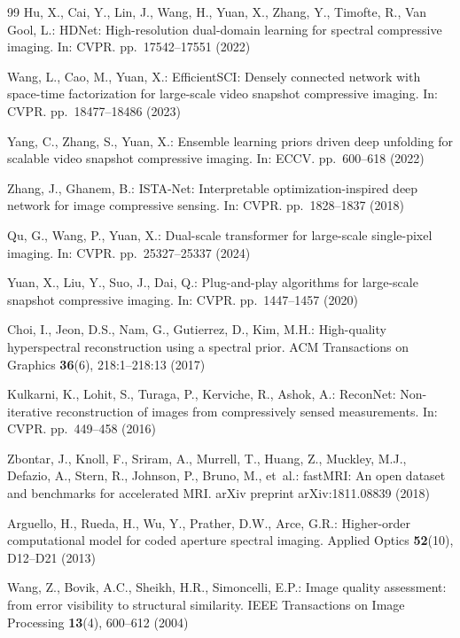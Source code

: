 \documentclass[runningheads]{llncs}
\begin{document}
\begin{thebibliography}{99}
Hu, X., Cai, Y., Lin, J., Wang, H., Yuan, X., Zhang, Y., Timofte, R., Van Gool, L.:
HDNet: High-resolution dual-domain learning for spectral compressive imaging.
In: CVPR. pp.~17542--17551 (2022)

Wang, L., Cao, M., Yuan, X.:
EfficientSCI: Densely connected network with space-time factorization for large-scale video snapshot compressive imaging.
In: CVPR. pp.~18477--18486 (2023)

Yang, C., Zhang, S., Yuan, X.:
Ensemble learning priors driven deep unfolding for scalable video snapshot compressive imaging.
In: ECCV. pp.~600--618 (2022)

Zhang, J., Ghanem, B.:
ISTA-Net: Interpretable optimization-inspired deep network for image compressive sensing.
In: CVPR. pp.~1828--1837 (2018)

Qu, G., Wang, P., Yuan, X.:
Dual-scale transformer for large-scale single-pixel imaging.
In: CVPR. pp.~25327--25337 (2024)

Yuan, X., Liu, Y., Suo, J., Dai, Q.:
Plug-and-play algorithms for large-scale snapshot compressive imaging.
In: CVPR. pp.~1447--1457 (2020)

Choi, I., Jeon, D.S., Nam, G., Gutierrez, D., Kim, M.H.:
High-quality hyperspectral reconstruction using a spectral prior.
ACM Transactions on Graphics \textbf{36}(6), 218:1--218:13 (2017)

Kulkarni, K., Lohit, S., Turaga, P., Kerviche, R., Ashok, A.:
ReconNet: Non-iterative reconstruction of images from compressively sensed measurements.
In: CVPR. pp.~449--458 (2016)

Zbontar, J., Knoll, F., Sriram, A., Murrell, T., Huang, Z., Muckley, M.J., Defazio, A., Stern, R., Johnson, P., Bruno, M., et~al.:
fastMRI: An open dataset and benchmarks for accelerated MRI.
arXiv preprint arXiv:1811.08839 (2018)


Arguello, H., Rueda, H., Wu, Y., Prather, D.W., Arce, G.R.:
Higher-order computational model for coded aperture spectral imaging.
Applied Optics \textbf{52}(10), D12--D21 (2013)

Wang, Z., Bovik, A.C., Sheikh, H.R., Simoncelli, E.P.:
Image quality assessment: from error visibility to structural similarity.
IEEE Transactions on Image Processing \textbf{13}(4), 600--612 (2004)


\end{thebibliography}
\end{document}
